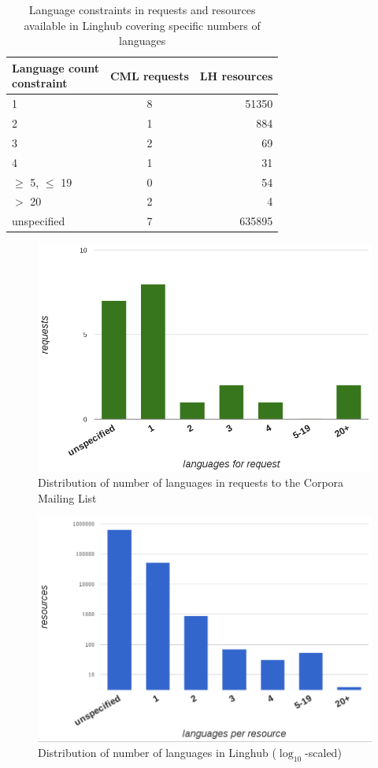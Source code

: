 \documentclass[smallextended]{svjour3}       %
\begin{document}
\begin{table}
  \centering
    \begin{tabular}{lcr}
    \toprule
    \bfseries \shortstack{Language count\\constraint} & \bfseries CML requests & \bfseries LH resources \\
    \midrule
    1                         & 8            & 51350 \\
    2                         & 1            & 884 \\
    3                         & 2            & 69 \\
    4                         & 1            & 31 \\
    $\geq$ 5, $\leq$ 19       & 0            & 54 \\  
    $>$ 20                    & 2            & 4 \\
    unspecified               & 7            & 635895 \\
    \bottomrule
\end{tabular}
    \caption{\label{tab:language-constraints}  Language constraints in requests
        and resources available in Linghub covering specific numbers of
    languages}
\end{table}

\begin{figure}
    \includegraphics[width=.6\textwidth]{img/eval_lang_per_request_2016_Mar.png}
    \caption{\label{fig:language-constraints1}Distribution of number of languages in
    requests to the Corpora Mailing List}
\end{figure}

\begin{figure}
    \includegraphics[width=.6\textwidth]{img/eval_lang_per_res_2016_Mar.png}
    \caption{\label{fig:language-constraints2}Distribution of number of languages in
    Linghub ($\log_{10}$-scaled)}
\end{figure}
\end{document}
